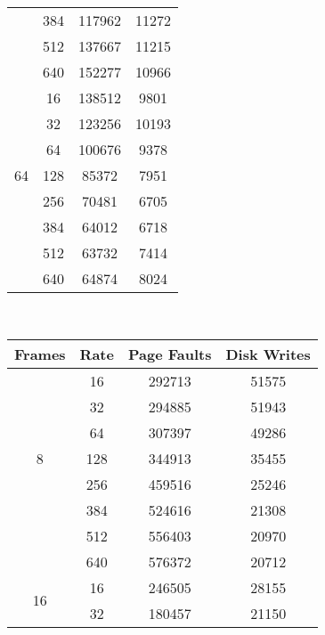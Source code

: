 \documentclass[letterpaper]{article}
\begin{document}
\begin{table}
\begin{multicols}{2}
\begin{tabular}{|c|c|c|c|}
                    & 384  & 117962      & 11272       \\ \cline{2-4} 
                    & 512  & 137667      & 11215       \\ \cline{2-4} 
                    & 640  & 152277      & 10966       \\ \hline
\multirow{7}{*}{64} & 16   & 138512      & 9801        \\ \cline{2-4} 
                    & 32   & 123256      & 10193       \\ \cline{2-4} 
                    & 64   & 100676      & 9378        \\ \cline{2-4} 
                    & 128  & 85372       & 7951        \\ \cline{2-4} 
                    & 256  & 70481       & 6705        \\ \cline{2-4} 
                    & 384  & 64012       & 6718        \\ \cline{2-4} 
                    & 512  & 63732       & 7414        \\ \cline{2-4} 
                    & 640  & 64874       & 8024        \\ \hline
\end{tabular}\smallbreak
{}\columnbreak\\
\begin{tabular}{|c|c|c|c|}
\hline
Frames              & Rate & Page Faults & Disk Writes \\ \hline
\multirow{7}{*}{8}  & 16   & 292713      & 51575       \\ \cline{2-4} 
                    & 32   & 294885      & 51943       \\ \cline{2-4} 
                    & 64   & 307397      & 49286       \\ \cline{2-4} 
                    & 128  & 344913      & 35455       \\ \cline{2-4} 
                    & 256  & 459516      & 25246       \\ \cline{2-4} 
                    & 384  & 524616      & 21308       \\ \cline{2-4} 
                    & 512  & 556403      & 20970       \\ \cline{2-4} 
                    & 640  & 576372      & 20712       \\ \hline
\multirow{7}{*}{16} & 16   & 246505      & 28155       \\ \cline{2-4} 
                    & 32   & 180457      & 21150       \\ \cline{2-4} 

\end{tabular}
\end{multicols}
\end{table}
\end{document}
